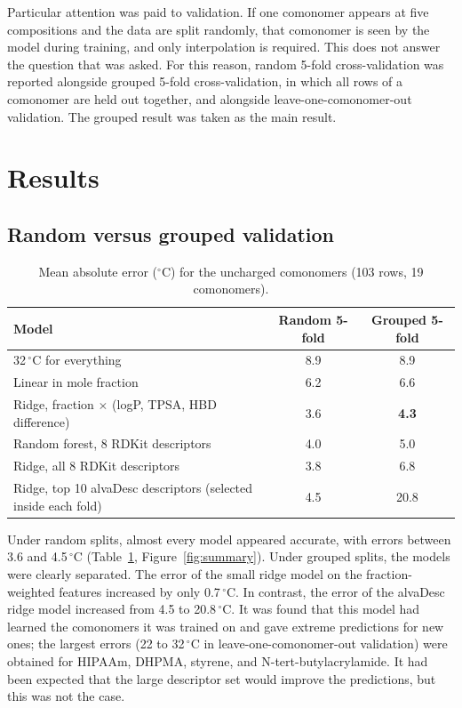 \documentclass[11pt,a4paper]{article}
\newcommand{\degC}{\ensuremath{^{\circ}}C}
\begin{document}
Particular attention was paid to validation. If one comonomer appears at five
compositions and the data are split randomly, that comonomer is seen by the model
during training, and only interpolation is required. This does not answer the
question that was asked. For this reason, random 5-fold cross-validation was reported
alongside grouped 5-fold cross-validation, in which all rows of a comonomer are held
out together, and alongside leave-one-comonomer-out validation. The grouped result was
taken as the main result.

\section{Results}

\subsection{Random versus grouped validation}

\begin{table}[H]
  \centering
  \small
  \caption{Mean absolute error (\degC) for the uncharged comonomers (103 rows, 19 comonomers).}
  \label{tab:metrics}
  \begin{tabular}{@{}lcc@{}}
    \toprule
    Model & Random 5-fold & Grouped 5-fold \\
    \midrule
    32\,\degC{} for everything & 8.9 & 8.9 \\
    Linear in mole fraction & 6.2 & 6.6 \\
    Ridge, fraction $\times$ (logP, TPSA, HBD difference) & 3.6 & \textbf{4.3} \\
    Random forest, 8 RDKit descriptors & 4.0 & 5.0 \\
    Ridge, all 8 RDKit descriptors & 3.8 & 6.8 \\
    Ridge, top 10 alvaDesc descriptors (selected inside each fold) & 4.5 & 20.8 \\
    \bottomrule
  \end{tabular}
\end{table}

Under random splits, almost every model appeared accurate, with errors between 3.6
and 4.5\,\degC{} (Table~\ref{tab:metrics}, Figure~\ref{fig:summary}). Under grouped
splits, the models were clearly separated. The error of the small ridge model on the
fraction-weighted features increased by only 0.7\,\degC. In contrast, the error of
the alvaDesc ridge model increased from 4.5 to 20.8\,\degC. It was found that this
model had learned the comonomers it was trained on and gave extreme predictions for
new ones; the largest errors (22 to 32\,\degC{} in leave-one-comonomer-out validation)
were obtained for HIPAAm, DHPMA, styrene, and N-tert-butylacrylamide. It had been expected that the large descriptor set would improve
the predictions, but this was not the case.
\end{document}

